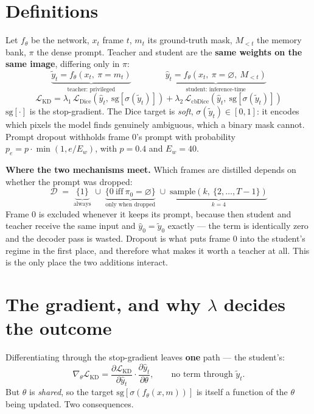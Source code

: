 \documentclass[9pt,a4paper]{extarticle}
\newcommand{\sg}{\mathrm{sg}}
\begin{document}
\section{Definitions}
Let $f_\theta$ be the network, $x_t$ frame $t$, $m_t$ its ground-truth mask, $M_{<t}$ the memory bank, $\pi$ the
dense prompt. Teacher and student are the \textbf{same weights on the same image}, differing only in $\pi$:
\[
\underbrace{\tilde{y}_t = f_\theta\!\left(x_t,\ \pi = m_t\right)}_{\text{teacher: privileged}}
\qquad\qquad
\underbrace{\hat{y}_t = f_\theta\!\left(x_t,\ \pi = \varnothing,\ M_{<t}\right)}_{\text{student: inference-time}}
\]
\[
\mathcal{L}_{\text{KD}}
= \lambda_1\,\mathcal{L}_{\text{Dice}}\!\left(\hat{y}_t,\ \sg\!\left[\sigma(\tilde{y}_t)\right]\right)
+ \lambda_2\,\mathcal{L}_{\text{cbDice}}\!\left(\hat{y}_t,\ \sg\!\left[\sigma(\tilde{y}_t)\right]\right)
\]
$\sg[\cdot]$ is the stop-gradient. The Dice target is \emph{soft}, $\sigma(\tilde y_t)\in[0,1]$: it encodes which
pixels the model finds genuinely ambiguous, which a binary mask cannot. Prompt dropout withholds frame 0's prompt
with probability $p_e = p\cdot\min(1, e/E_w)$, with $p=0.4$ and $E_w=40$.

\textbf{Where the two mechanisms meet.} Which frames are distilled depends on whether the prompt was dropped:
\[
\mathcal{D} \;=\;
\underbrace{\{1\}}_{\text{always}}
\;\cup\;
\underbrace{\{0\ \text{iff}\ \pi_0=\varnothing\}}_{\text{only when dropped}}
\;\cup\;
\underbrace{\text{sample}(k,\ \{2,\dots,T-1\})}_{k=4}
\]
Frame 0 is excluded whenever it keeps its prompt, because then student and teacher receive the same input and
$\hat y_0 = \tilde y_0$ exactly --- the term is identically zero and the decoder pass is wasted. Dropout is what
puts frame 0 into the student's regime in the first place, and therefore what makes it worth a teacher at all.
This is the only place the two additions interact.

\section{The gradient, and why $\lambda$ decides the outcome}
Differentiating through the stop-gradient leaves \textbf{one} path --- the student's:
\[
\nabla_\theta \mathcal{L}_{\text{KD}}
= \frac{\partial \mathcal{L}_{\text{KD}}}{\partial \hat{y}_t}\cdot\frac{\partial \hat{y}_t}{\partial \theta},
\qquad\text{no term through } \tilde y_t .
\]
But $\theta$ is \emph{shared}, so the target $\sg[\sigma(f_\theta(x,m))]$ is itself a function of the $\theta$
being updated. Two consequences.
\end{document}
